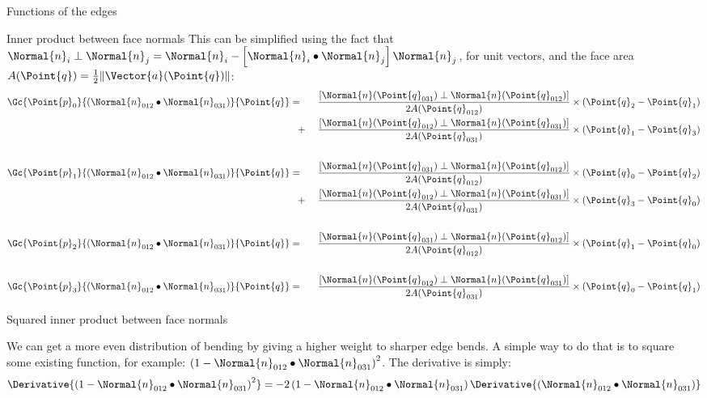 \begin{plSection}{Functions of the edges}
\begin{plSection}{Inner product between face normals}
This can be simplified using the fact that
\(\Normal{n}_i \perp \Normal{n}_j = \Normal{n}_i - \left[ \Normal{n}_i \bullet \Normal{n}_j \right] \Normal{n}_j\), for unit vectors,
and the face area \(A(\Point{q}) = \frac{1}{2} \| \Vector{a}(\Point{q}) \|\):
\begin{eqnarray}
\label{eq:simplified_normal_dot_gradient}
\Gc{\Point{p}_0}{(\Normal{n}_{012} \bullet \Normal{n}_{031})}{\Point{q}}
& = \;\;\; &
\frac{\left[ \Normal{n}(\Point{q}_{031}) \perp \Normal{n}(\Point{q}_{012}) \right]}{2A(\Point{q}_{012})}
\times (\Point{q}_2 - \Point{q}_1)
\\
& \;\;\; + &
\frac{\left[ \Normal{n}(\Point{q}_{012}) \perp \Normal{n}(\Point{q}_{031}) \right]}{2A(\Point{q}_{031})}
\times (\Point{q}_1 - \Point{q}_3)
\nonumber \\
& & \nonumber \\
\Gc{\Point{p}_1}{(\Normal{n}_{012} \bullet \Normal{n}_{031})}{\Point{q}}
& = \;\;\; &
\frac{\left[ \Normal{n}(\Point{q}_{031}) \perp \Normal{n}(\Point{q}_{012}) \right]}{2A(\Point{q}_{012})}
\times (\Point{q}_0 - \Point{q}_2)
\nonumber \\
& \;\;\; + &
\frac{\left[ \Normal{n}(\Point{q}_{012}) \perp \Normal{n}(\Point{q}_{031}) \right]}{2A(\Point{q}_{031})}
\times (\Point{q}_3 - \Point{q}_0)
\nonumber \\
& & \nonumber \\
\Gc{\Point{p}_2}{(\Normal{n}_{012} \bullet \Normal{n}_{031})}{\Point{q}}
& = \;\;\; &
\frac{\left[ \Normal{n}(\Point{q}_{031}) \perp \Normal{n}(\Point{q}_{012}) \right]}{2A(\Point{q}_{012})}
\times (\Point{q}_1 - \Point{q}_0)
\nonumber \\
& & \nonumber \\
\Gc{\Point{p}_3}{(\Normal{n}_{012} \bullet \Normal{n}_{031})}{\Point{q}}
& = \;\;\; &
\frac{\left[ \Normal{n}(\Point{q}_{012}) \perp \Normal{n}(\Point{q}_{031}) \right]}{2A(\Point{q}_{031})}
\times (\Point{q}_0 - \Point{q}_1)
\nonumber
\end{eqnarray}

\end{plSection}%
\begin{plSection}{Squared inner product between face normals}
\label{sec:squared_normal_dot}

We can get a more even distribution of bending by giving
a higher weight to sharper edge bends.
A simple way to do that is to square some existing function,
for example: $\left(1 - \Normal{n}_{012} \bullet \Normal{n}_{031}\right)^2$.
The derivative is simply:
\begin{equation}
\Derivative{\left(1 - \Normal{n}_{012} \bullet \Normal{n}_{031}\right)^2}
= -2 \left( 1 - \Normal{n}_{012} \bullet \Normal{n}_{031} \right)
\Derivative{(\Normal{n}_{012} \bullet \Normal{n}_{031})}
\end{equation}


\end{plSection}
\end{plSection}
